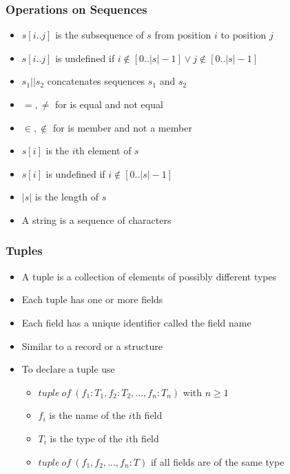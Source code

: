 \documentclass[t,12pt,numbers,fleqn]{beamer}
\begin{document}
\begin{frame}
\frametitle{Operations on Sequences}
\begin{itemize}
\item $s[i..j]$ is the subsequence of $s$ from position $i$ to position $j$
\item $s[i..j]$ is undefined if $i \notin [0..|s|-1] \vee j \notin [0 .. |s|-1]$
\item $s_1 || s_2$ concatenates sequences $s_1$ and $s_2$
\item $=, \neq$ for is equal and not equal
\item $\in, \notin$ for is member and not a member
\item $s[i]$ is the $i$th element of $s$
\item $s[i]$ is undefined if $i \notin [0..|s|-1]$
\item $|s|$ is the length of $s$
\item A string is a sequence of characters
\end{itemize}
\end{frame}


\begin{frame}
\frametitle{Tuples}
\begin{itemize}
\item A tuple is a collection of elements of possibly different types
\item Each tuple has one or more fields
\item Each field has a unique identifier called the field name
\item Similar to a record or a structure
\item To declare a tuple use
\begin{itemize}
\item $tuple~of~(f_1: T_1, f_2: T_2, ..., f_n: T_n )$ with $n \geq 1$
\item $f_i$ is the name of the $i$th field
\item $T_i$ is the type of the $i$th field
\item $tuple~of~(f_1, f_2, ..., f_n: T )$ if all fields are of the same type
\end{itemize}
\end{itemize}
\end{frame}

\end{document}
